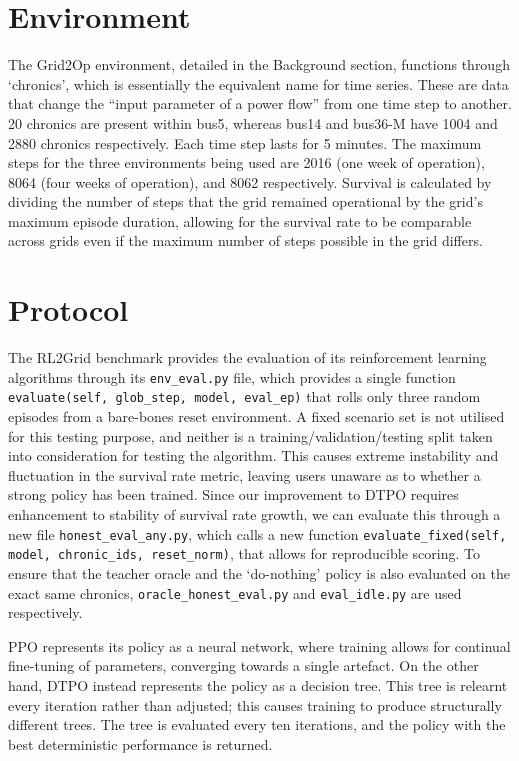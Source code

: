 \section{Environment}

The Grid2Op environment, detailed in the Background section, functions through `chronics', which is essentially the equivalent name for time series. These are data that change the ``input parameter of a power flow'' from one time step to another. 20 chronics are present within bus5, whereas bus14 and bus36-M have 1004 and 2880 chronics respectively. Each time step lasts for 5 minutes. The maximum steps for the three environments being used are 2016 (one week of operation), 8064 (four weeks of operation), and 8062 respectively. Survival is calculated by dividing the number of steps that the grid remained operational by the grid's maximum episode duration, allowing for the survival rate to be comparable across grids even if the maximum number of steps possible in the grid differs. 

\section{Protocol}

The RL2Grid benchmark provides the evaluation of its reinforcement learning algorithms through its \texttt{env\_eval.py} file, which provides a single function \texttt{evaluate(self, glob\_step, model, eval\_ep)} that rolls only three random episodes from a bare-bones reset environment. A fixed scenario set is not utilised for this testing purpose, and neither is a training/validation/testing split taken into consideration for testing the algorithm. This causes extreme instability and fluctuation in the survival rate metric, leaving users unaware as to whether a strong policy has been trained. Since our improvement to DTPO requires enhancement to stability of survival rate growth, we can evaluate this through a new file \texttt{honest\_eval\_any.py}, which calls a new function \texttt{evaluate\_fixed(self, model, chronic\_ids, reset\_norm)}, that allows for reproducible scoring. To ensure that the teacher oracle and the `do-nothing' policy is also evaluated on the exact same chronics, \texttt{oracle\_honest\_eval.py} and \texttt{eval\_idle.py} are used respectively.

PPO represents its policy as a neural network, where training allows for continual fine-tuning of parameters, converging towards a single artefact. On the other hand, DTPO instead represents the policy as a decision tree. This tree is relearnt every iteration rather than adjusted; this causes training to produce structurally different trees. The tree is evaluated every ten iterations, and the policy with the best deterministic performance is returned.     

